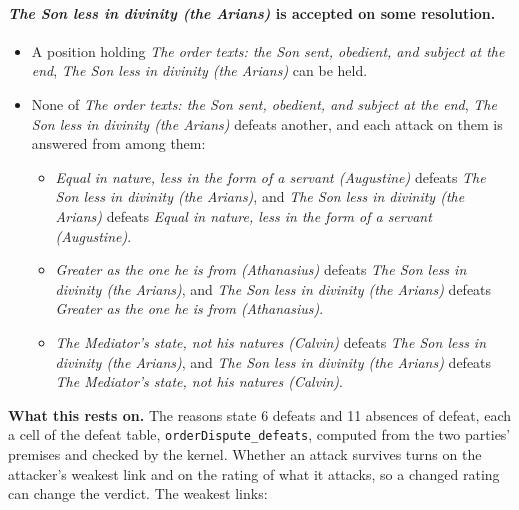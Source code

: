 \documentclass[11pt,paper=\testimonypaper,DIV=13,parskip=false]{scrartcl}
\begin{document}
\paragraph{\emph{The Son less in divinity (the Arians)} is accepted on some resolution.}
\begin{itemize}
\item A position holding \emph{The order texts: the Son sent, obedient, and subject at the end}, \emph{The Son less in divinity (the Arians)} can be held.
\item None of \emph{The order texts: the Son sent, obedient, and subject at the end}, \emph{The Son less in divinity (the Arians)} defeats another, and each attack on them is answered from among them:
\begin{itemize}
\item \emph{Equal in nature, less in the form of a servant (Augustine)} defeats \emph{The Son less in divinity (the Arians)}, and \emph{The Son less in divinity (the Arians)} defeats \emph{Equal in nature, less in the form of a servant (Augustine)}.
\item \emph{Greater as the one he is from (Athanasius)} defeats \emph{The Son less in divinity (the Arians)}, and \emph{The Son less in divinity (the Arians)} defeats \emph{Greater as the one he is from (Athanasius)}.
\item \emph{The Mediator’s state, not his natures (Calvin)} defeats \emph{The Son less in divinity (the Arians)}, and \emph{The Son less in divinity (the Arians)} defeats \emph{The Mediator’s state, not his natures (Calvin)}.
\end{itemize}
\end{itemize}
\par\noindent\textbf{What this rests on.} The reasons state 6 defeats and 11 absences of defeat, each a cell of the defeat table, \texttt{order\allowbreak{}Dispute\_\allowbreak{}defeats}, computed from the two parties' premises and checked by the kernel. Whether an attack survives turns on the attacker's weakest link and on the rating of what it attacks, so a changed rating can change the verdict. The weakest links:
\end{document}
